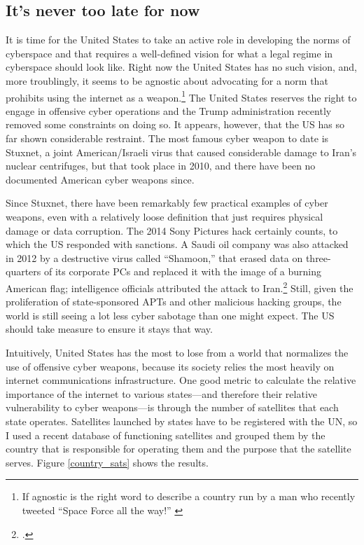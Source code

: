 \documentclass[11pt]{memoir}
\begin{document}
\subsection{It's never too late for now}
It is time for the United States to take an active role in developing the norms of cyberspace and that requires a well-defined vision for what a legal regime in cyberspace should look like. Right now the United States has no such vision, and, more troublingly, it seems to be agnostic about advocating for a norm that prohibits using the internet as a weapon.\footnote{If agnostic is the right word to describe a country run by a man who recently tweeted ``Space Force all the way!'' \cite{trump_twitter_2018}} The United States reserves the right to engage in offensive cyber operations and the Trump administration recently removed some constraints on doing so. It appears, however, that the US has so far shown considerable restraint. The most famous cyber weapon to date is Stuxnet, a joint American/Israeli virus that caused considerable damage to Iran's nuclear centrifuges, but that took place in 2010, and there have been no documented American cyber weapons since.

Since Stuxnet, there have been remarkably few practical examples of cyber weapons, even with a relatively loose definition that just requires physical damage or data corruption. The 2014 Sony Pictures hack certainly counts, to which the US responded with sanctions. A Saudi oil company was also attacked in 2012 by a destructive virus called ``Shamoon,'' that erased data on three-quarters of its corporate PCs and replaced it with the image of a burning American flag; intelligence officials attributed the attack to Iran.\footcite{perlroth_cyberattack_2012} Still, given the proliferation of state-sponsored APTs and other malicious hacking groups, the world is still seeing a lot less cyber sabotage than one might expect. The US should take measure to ensure it stays that way.

Intuitively, United States has the most to lose from a world that normalizes the use of offensive cyber weapons, because its society relies the most heavily on internet communications infrastructure. One good metric to calculate the relative importance of the internet to various states---and therefore their relative vulnerability to cyber weapons---is through the number of satellites that each state operates. Satellites launched by states have to be registered with the UN, so I used a recent database of functioning satellites and grouped them by the country that is responsible for operating them and the purpose that the satellite serves. Figure \ref{country_sats} shows the results.
\end{document}
